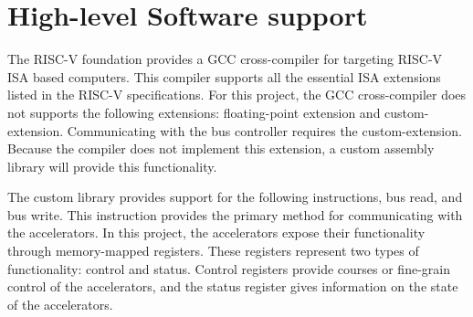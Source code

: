 \documentclass[../main.tex]{subfiles}
\begin{document}
\section{High-level Software support}
The RISC-V foundation provides a GCC cross-compiler for targeting RISC-V ISA based computers. This compiler supports all the essential ISA extensions listed in the RISC-V specifications\cite{RISC-V-isa}. For this project, the GCC cross-compiler does not supports the following extensions: floating-point extension and custom-extension. Communicating with the bus controller requires the custom-extension. Because the compiler does not implement this extension, a custom assembly library will provide this functionality.  

The custom library provides support for the following instructions, bus read, and bus write. This instruction provides the primary method for communicating with the accelerators.  In this project, the accelerators expose their functionality through memory-mapped registers. These registers represent two types of functionality: control and status. Control registers provide courses or fine-grain control of the accelerators, and the status register gives information on the state of the accelerators. 
\end{document}
